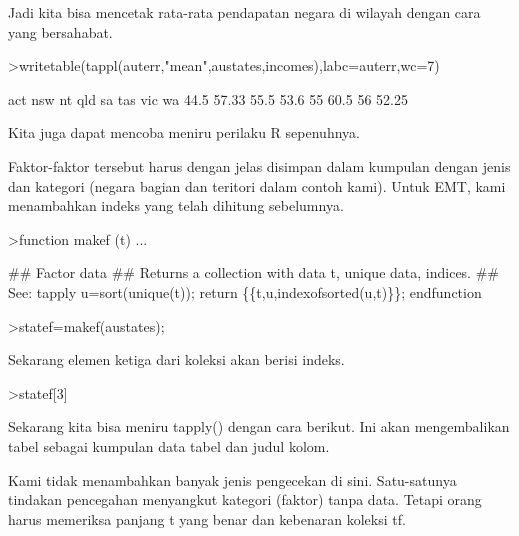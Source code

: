 \documentclass{article}
\begin{document}
\begin{eulernotebook}
\begin{eulercomment}
\begin{eulercomment}
\begin{eulercomment}
Jadi kita bisa mencetak rata-rata pendapatan negara di wilayah dengan
cara yang bersahabat.
\end{eulercomment}
\begin{eulerprompt}
>writetable(tappl(auterr,"mean",austates,incomes),labc=auterr,wc=7)
\end{eulerprompt}
\begin{euleroutput}
      act    nsw     nt    qld     sa    tas    vic     wa
     44.5  57.33   55.5   53.6     55   60.5     56  52.25
\end{euleroutput}
\begin{eulercomment}
Kita juga dapat mencoba meniru perilaku R sepenuhnya.

Faktor-faktor tersebut harus dengan jelas disimpan dalam kumpulan
dengan jenis dan kategori (negara bagian dan teritori dalam contoh
kami). Untuk EMT, kami menambahkan indeks yang telah dihitung
sebelumnya.
\end{eulercomment}
\begin{eulerprompt}
>function makef (t) ...
\end{eulerprompt}
\begin{eulerudf}
  ## Factor data
  ## Returns a collection with data t, unique data, indices.
  ## See: tapply
  u=sort(unique(t));
  return \{\{t,u,indexofsorted(u,t)\}\};
  endfunction
\end{eulerudf}
\begin{eulerprompt}
>statef=makef(austates);
\end{eulerprompt}
\begin{eulercomment}
Sekarang elemen ketiga dari koleksi akan berisi indeks.
\end{eulercomment}
\begin{eulerprompt}
>statef[3]
\end{eulerprompt}
\begin{euleroutput}
  [6,  5,  4,  2,  2,  3,  8,  8,  4,  7,  2,  7,  4,  4,  5,  6,  5,  3,
  8,  7,  4,  2,  2,  8,  5,  1,  2,  7,  7,  1]
\end{euleroutput}
\begin{eulercomment}
Sekarang kita bisa meniru tapply() dengan cara berikut. Ini akan
mengembalikan tabel sebagai kumpulan data tabel dan judul kolom.
\end{eulercomment}
\begin{eulercomment}
Kami tidak menambahkan banyak jenis pengecekan di sini. Satu-satunya
tindakan pencegahan menyangkut kategori (faktor) tanpa data. Tetapi
orang harus memeriksa panjang t yang benar dan kebenaran koleksi tf.


\end{eulercomment}
\end{eulercomment}
\end{eulercomment}
\end{eulernotebook}
\end{document}
